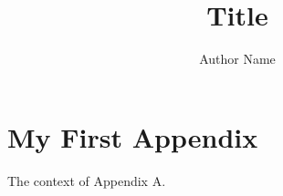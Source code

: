 \documentclass[11pt]{report}
\title{Title}
\author{Author Name}
\date{\the\year{}}
\begin{document}
\onehalfspacing



\maketitle













%


\renewcommand{\bibname}{References}








\appendix

\chapter{My First Appendix}
\label{app:AppendixA}

The context of Appendix A.
\end{document}
